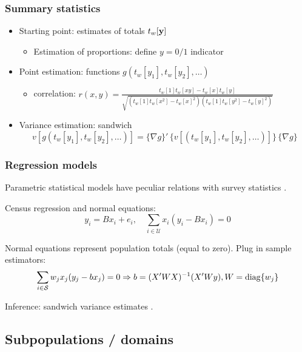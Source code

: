 \documentclass{beamer}
\begin{document}
\begin{frame}\frametitle{Summary statistics}

\begin{itemize}
    \item Starting point: estimates of totals $t_w[{\bf y}]$
        \begin{itemize} \item Estimation of proportions: define $y=0/1$ indicator \end{itemize}
    \item Point estimation: functions $g(t_w[y_1], t_w[y_2], \ldots)$
        \begin{itemize}
            \item correlation: $r(x,y) = \frac{t_w[1]t_w[xy]-t_w[x]t_w[y]}%
                {\sqrt{(t_w[1]t_w[x^2]-t_w[x]^2)(t_w[1]t_w[y^2]-t_w[y]^2)}}$
        \end{itemize}
    \item Variance estimation: sandwich
        $$
            v[g(t_w[y_1], t_w[y_2], \ldots)] = \{\nabla g\}' \, \{ v[(t_w[y_1], t_w[y_2], \ldots)] \} \, \{\nabla g \}
        $$
\end{itemize}

\end{frame}

\begin{frame}\frametitle{Regression models}

Parametric statistical models have peculiar relations with survey statistics
\citep{skinner:1989,binder:roberts:2003,binder:roberts:2009,pfeffermann:2011:whymodel}.

Census regression and normal equations:
$$
y_i = B x_i + e_i, \quad \sum_{i\in\mathcal{U}} x_i (y_i - B x_i) = 0
$$

Normal equations represent population totals (equal to zero). Plug in sample estimators:
$$
\sum_{i\in\mathcal{S}} w_j x_j (y_j - b x_j) = 0 \Rightarrow b = (X'WX)^{-1} (X'Wy), W = {\rm diag}\{ w_j \}
$$

Inference: sandwich variance estimates \citep{fuller:1975,binder:1983}.

\end{frame}

\subsection{Subpopulations / domains}
\end{document}

